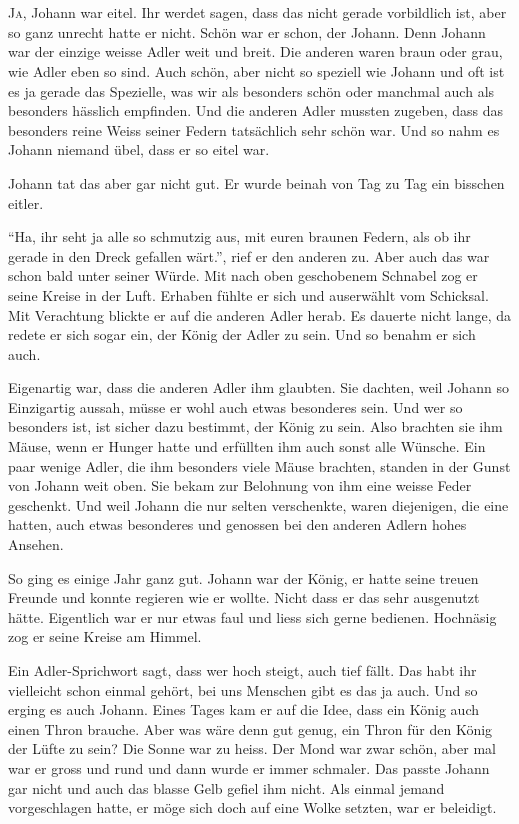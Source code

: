 \chapter*{}
\lettrine[lines=3]{\color{DeepPink}J}{a}, Johann war eitel. Ihr werdet sagen,
dass das nicht gerade vorbildlich ist, aber so ganz unrecht hatte er nicht. Schön war er schon, der Johann. Denn Johann war der einzige weisse Adler weit und breit. Die anderen waren braun oder grau, wie Adler eben so sind. Auch schön, aber nicht so speziell wie Johann und oft ist es ja gerade das Spezielle, was wir als besonders schön oder manchmal auch als besonders hässlich empfinden. Und die anderen Adler mussten zugeben, dass das besonders reine Weiss seiner Federn tatsächlich sehr schön war. Und so nahm es Johann niemand übel, dass er so eitel war. 

Johann tat das aber gar nicht gut. Er wurde beinah von Tag zu Tag ein bisschen eitler. 

\enquote{Ha, ihr seht ja alle so schmutzig aus, mit euren braunen Federn, als ob ihr gerade in den Dreck gefallen wärt.}, rief er den anderen zu. Aber auch das war schon bald unter seiner Würde. Mit nach oben geschobenem Schnabel zog er seine Kreise in der Luft. Erhaben fühlte er sich und auserwählt vom Schicksal. Mit Verachtung blickte er auf die anderen Adler herab. Es dauerte nicht lange, da redete er sich sogar ein, der König der Adler zu sein. Und so benahm er sich auch.

Eigenartig war, dass die anderen Adler ihm glaubten. Sie dachten, weil Johann so Einzigartig aussah, müsse er wohl auch etwas besonderes sein. Und wer so besonders ist, ist sicher dazu bestimmt, der König zu sein. Also brachten sie ihm Mäuse, wenn er Hunger hatte und erfüllten ihm auch sonst alle Wünsche. Ein paar wenige Adler, die ihm besonders viele Mäuse brachten, standen in der Gunst von Johann weit oben. Sie bekam zur Belohnung von ihm eine weisse Feder geschenkt. Und weil Johann die nur selten verschenkte, waren diejenigen, die eine hatten, auch etwas besonderes und genossen bei den anderen Adlern hohes Ansehen. 

So ging es einige Jahr ganz gut. Johann war der König, er hatte seine treuen Freunde und konnte regieren wie er wollte. Nicht dass er das sehr ausgenutzt hätte. Eigentlich war er nur etwas faul und liess sich gerne bedienen. Hochnäsig zog er seine Kreise am Himmel.

Ein Adler-Sprichwort sagt, dass wer hoch steigt, auch tief fällt. Das habt ihr vielleicht schon einmal gehört, bei uns Menschen gibt es das ja auch. Und so erging es auch Johann. Eines Tages kam er auf die Idee, dass ein König auch einen Thron brauche. Aber was wäre denn gut genug, ein Thron für den König der Lüfte zu sein? Die Sonne war zu heiss. Der Mond war zwar schön, aber mal war er gross und rund und dann wurde er immer schmaler. Das passte Johann gar nicht und auch das blasse Gelb gefiel ihm nicht. Als einmal jemand vorgeschlagen hatte, er möge sich doch auf eine Wolke setzten, war er beleidigt.

